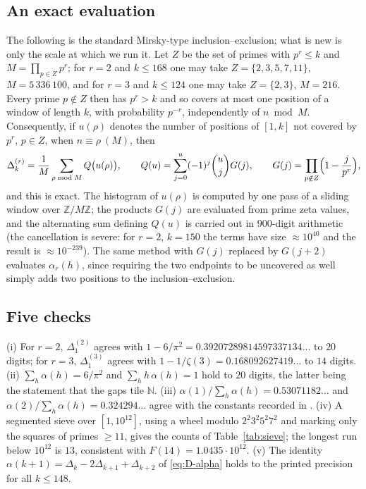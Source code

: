 \documentclass[11pt,reqno]{amsart}
\theoremstyle{plain}
\theoremstyle{definition}
\numberwithin{equation}{section}
\newcommand{\N}{\mathbb{N}}
\newcommand{\Z}{\mathbb{Z}}
\begin{document}
\subsection{An exact evaluation}
The following is the standard Mirsky-type inclusion--exclusion; what is new is only the
scale at which we run it. Let $Z$ be the set of primes with $p^{r}\le k$ and
$M=\prod_{p\in Z}p^{r}$; for $r=2$ and $k\le168$ one may take $Z=\{2,3,5,7,11\}$,
$M=5\,336\,100$, and for $r=3$ and $k\le124$ one may take $Z=\{2,3\}$, $M=216$. Every prime
$p\notin Z$ then has $p^{r}>k$ and so covers at most one position of a window of length
$k$, with probability $p^{-r}$, independently of $n\bmod M$. Consequently, if $u(\rho)$
denotes the number of positions of $[1,k]$ not covered by $p^{r}$, $p\in Z$, when
$n\equiv\rho\ (M)$, then
\begin{equation}\label{eq:exact}
  \Delta^{(r)}_k=\frac1M\sum_{\rho\bmod M}Q\bigl(u(\rho)\bigr),\qquad
  Q(u)=\sum_{j=0}^{u}(-1)^{j}\binom{u}{j}G(j),\qquad
  G(j)=\prod_{p\notin Z}\Bigl(1-\frac j{p^{r}}\Bigr),
\end{equation}
and this is exact. The histogram of $u(\rho)$ is computed by one pass of a sliding window
over $\Z/M\Z$; the products $G(j)$ are evaluated from prime zeta values, and the
alternating sum defining $Q(u)$ is carried out in $900$-digit arithmetic (the cancellation
is severe: for $r=2$, $k=150$ the terms have size $\approx10^{40}$ and the result is
$\approx10^{-239}$). The same method with $G(j)$ replaced by $G(j+2)$ evaluates
$\alpha_r(h)$, since requiring the two endpoints to be uncovered as well simply adds two
positions to the inclusion--exclusion.

\subsection{Five checks}
(i) For $r=2$, $\Delta^{(2)}_1$ agrees with $1-6/\pi^{2}=0.39207289814597337134\ldots$ to
$20$ digits; for $r=3$, $\Delta^{(3)}_1$ agrees with $1-1/\zeta(3)=0.168092627419\ldots$
to $14$ digits. (ii) $\sum_h\alpha(h)=6/\pi^{2}$ and $\sum_h h\,\alpha(h)=1$ hold to $20$
digits, the latter being the statement that the gaps tile $\N$. (iii)
$\alpha(1)/\sum_h\alpha(h)=0.53071182\ldots$ and $\alpha(2)/\sum_h\alpha(h)=0.324294\ldots$
agree with the constants recorded in \cite[\texttt{A076259}]{OEIS}. (iv) A segmented sieve
over $[1,10^{12}]$, using a wheel modulo $2^{2}3^{2}5^{2}7^{2}$ and marking only the squares
of primes $\ge11$, gives the counts of Table~\ref{tab:sieve}; the longest run below
$10^{12}$ is $13$, consistent with $F(14)=1.0435\cdot10^{12}$. (v) The identity
$\alpha(k+1)=\Delta_k-2\Delta_{k+1}+\Delta_{k+2}$ of \eqref{eq:D-alpha} holds to the
printed precision for all $k\le148$.
\end{document}

